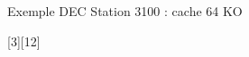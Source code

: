 %
\begin{Frame}{Exemple DEC Station 3100 : cache 64 KO}

\vspace{-0,8cm}
        \begin{center}
       [3][12] \hspace{2cm}
        \end{center}
      
\end{Frame}


